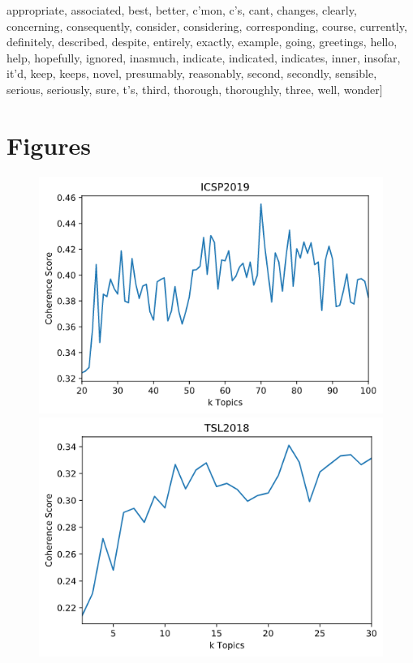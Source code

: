 \documentclass[a4paper, 12pt, twoside]{article}
\numberwithin{equation}{section} %
\begin{document}
{{\begin{appendices}
\begin{spverbatim}
appropriate,  associated,  best,  better,  c'mon,  c's,  cant,  changes,  clearly,  concerning,  consequently,  consider,  considering,  corresponding,  course,  currently,  definitely,  described,  despite,  entirely,  exactly,  example,  going,  greetings,  hello,  help,  hopefully,  ignored,  inasmuch,  indicate,  indicated,  indicates,  inner,  insofar,  it'd,  keep,  keeps,  novel,  presumably,  reasonably,  second,  secondly,  sensible,  serious,  seriously,  sure,  t's,  third,  thorough,  thoroughly,  three,  well,  wonder]
\end{spverbatim}

\newpage

\section{Figures}
\label{Figures}

\begin{figure}[htb]
  \centering
  \includegraphics[height = 0.24\textheight]{ICSP_coherence.png}

  \vspace{0.00mm}

  \includegraphics[height = 0.24\textheight]{informs_coherence.png}
  

\end{figure}
\end{appendices}}}
\end{document}
